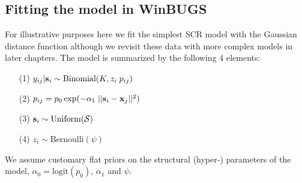 \subsection{Fitting the model in WinBUGS}

For illustrative purposes here we fit the simplest SCR model with the
Gaussian distance function although we revisit these data with more
complex models in later chapters. The model is summarized by the
following 4 elements:
\begin{itemize}
\item[(1)] $y_{ij}|{\bf s}_{i} \sim \mbox{Binomial}(K, z_{i}\; p_{ij})$
\item[(2)] $p_{ij} = p_{0} \exp(-\alpha_{1} \; ||{\bf s}_{i}-{\bf x}_{j}||^2)$
\item[(3)] ${\bf s}_{i} \sim \mbox{Uniform}({\cal S})$
\item[(4)] $z_{i} \sim \mbox{Bernoulli}(\psi)$
\end{itemize}
We assume customary flat priors on the structural (hyper-) parameters
of the model, $\alpha_{0} = \mbox{logit}(p_{0})$, $\alpha_{1}$ and
$\psi$.

